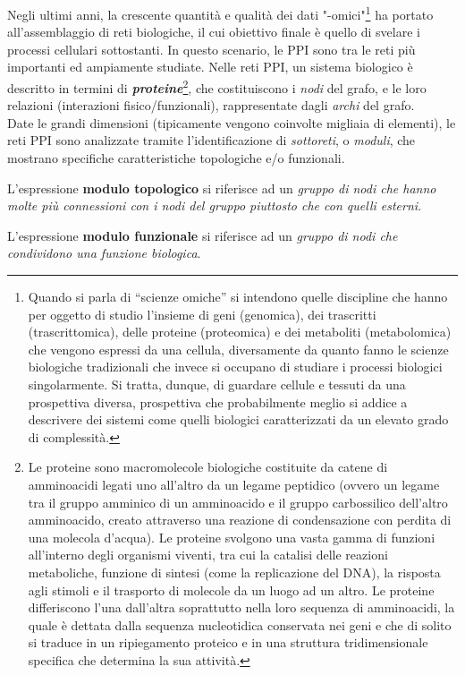 \documentclass[11pt]{article}
\begin{document}
Negli ultimi anni, la crescente quantità e qualità dei dati "-omici"\footnote{Quando si parla di “scienze omiche” si intendono quelle discipline che hanno per oggetto di studio l’insieme di geni (genomica), dei trascritti (trascrittomica), delle proteine (proteomica) e dei metaboliti (metabolomica) che vengono espressi da una cellula, diversamente da quanto fanno le scienze biologiche tradizionali che invece si occupano di studiare i processi biologici singolarmente. Si tratta, dunque, di guardare cellule e tessuti da una prospettiva diversa, prospettiva che probabilmente meglio si addice a descrivere dei sistemi come quelli biologici caratterizzati da un elevato grado di complessità.} ha portato all'assemblaggio di reti biologiche, il cui obiettivo finale è quello di svelare i processi cellulari sottostanti. In questo scenario, le PPI sono tra le reti più importanti ed ampiamente studiate. Nelle reti PPI, un sistema biologico è descritto in termini di \textit{\textbf{proteine}}\footnote{Le proteine sono macromolecole biologiche costituite da catene di amminoacidi legati uno all'altro da un legame peptidico (ovvero un legame tra il gruppo amminico di un amminoacido e il gruppo carbossilico dell'altro amminoacido, creato attraverso una reazione di condensazione con perdita di una molecola d'acqua). Le proteine svolgono una vasta gamma di funzioni all'interno degli organismi viventi, tra cui la catalisi delle reazioni metaboliche, funzione di sintesi (come la replicazione del DNA), la risposta agli stimoli e il trasporto di molecole da un luogo ad un altro. Le proteine differiscono l'una dall'altra soprattutto nella loro sequenza di amminoacidi, la quale è dettata dalla sequenza nucleotidica conservata nei geni e che di solito si traduce in un ripiegamento proteico e in una struttura tridimensionale specifica che determina la sua attività.}, 
che costituiscono i \textit{nodi} del grafo, e le loro relazioni (interazioni fisico/funzionali), rappresentate dagli \textit{archi} del grafo.\\

Date le grandi dimensioni (tipicamente vengono coinvolte migliaia di elementi), le reti PPI sono analizzate tramite l'identificazione di \textit{sottoreti}, o \textit{moduli}, che mostrano specifiche caratteristiche topologiche e/o funzionali.

L'espressione \textbf{modulo topologico} si riferisce ad un \textit{gruppo di nodi che hanno molte più connessioni con i nodi del gruppo piuttosto che con quelli esterni}. 

L'espressione \textbf{modulo funzionale} si riferisce ad un \textit{gruppo di nodi che condividono una funzione biologica}. 
\end{document}
